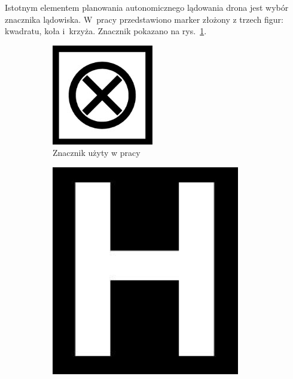 Istotnym elementem planowania autonomicznego lądowania drona jest wybór znacznika lądowiska. 
W~pracy \cite{Falanga} przedstawiono marker złożony z trzech figur: kwadratu, koła i~krzyża. 
Znacznik pokazano na rys.~\ref{fig:znacznik_falanga}. 
\begin{figure}
	\centering
		
		\begin{subfigure}{0.3\textwidth}
		\centering
		\includegraphics[width=\textwidth]{znacznik_falanga.jpg}
		\caption{Znacznik użyty w pracy \cite{Falanga}}
		\label{fig:znacznik_falanga}
		\end{subfigure}%
		\begin{subfigure}{0.3\textwidth}
		\centering
		\includegraphics[width=0.9\textwidth]{znacznik_H.jpg}

\end{subfigure}
\end{figure}

